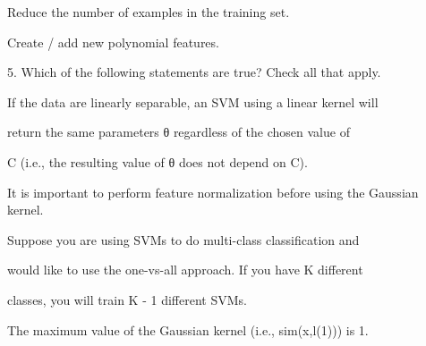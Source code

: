 \documentclass[11pt]{article} %
\begin{document}
Reduce the number of examples in the training set.

Create / add new polynomial features.

5. 
Which of the following statements are true? Check all that apply.

If the data are linearly separable, an SVM using a linear kernel will

return the same parameters θ regardless of the chosen value of

C (i.e., the resulting value of θ does not depend on C).

It is important to perform feature normalization before using the Gaussian kernel.

Suppose you are using SVMs to do multi-class classification and

would like to use the one-vs-all approach. If you have K different

classes, you will train K - 1 different SVMs.

The maximum value of the Gaussian kernel (i.e., sim(x,l(1))) is 1.

\end{document}

